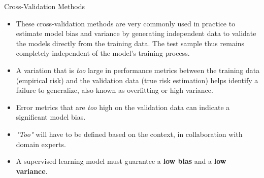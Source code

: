 \begin{frame}{Cross-Validation Methods}
	\begin{itemize}
		\item These cross-validation methods are very commonly used in practice to estimate model bias and variance by generating independent data to validate the models directly from the training data. The test sample thus remains completely independent of the model's training process.
		\pause
		\item A variation that is \textit{too} large in performance metrics between the training data (empirical risk) and the validation data (true risk estimation) helps identify a failure to generalize, also known as overfitting or high variance.
		\pause
		\item Error metrics that are \textit{too} high on the validation data can indicate a significant model bias.
		\pause
		\item \textit{"Too"} will have to be defined based on the context, in collaboration with domain experts.
		\pause
		\item A supervised learning model must guarantee a \textbf{low bias} and a \textbf{low variance}.
	\end{itemize}
\end{frame}
